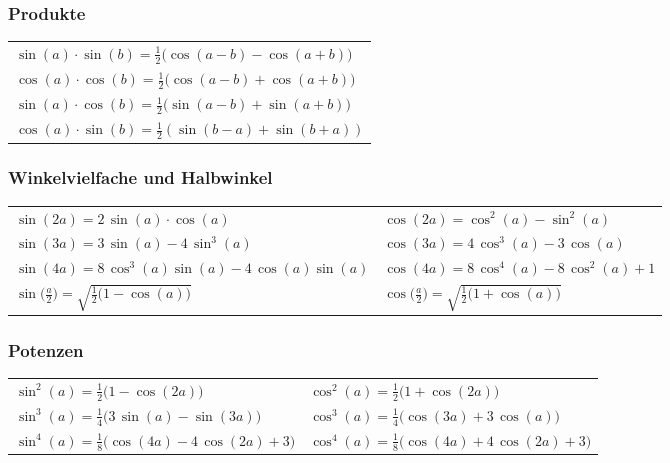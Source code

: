\subsubsection{Produkte}

\begin{tabular}{l}
    $\sin(a) \cdot \sin(b) = \frac{1}{2} \big( \cos(a-b) - \cos(a+b) \big) $ \\
    $\cos(a) \cdot \cos(b) = \frac{1}{2} \big( \cos(a-b) + \cos(a+b) \big) $ \\	
    $\sin(a) \cdot \cos(b) = \frac{1}{2} \big( \sin(a-b) + \sin(a+b) \big) $ \\
    $\cos(a) \cdot \sin(b) = \frac{1}{2} \left( \sin(b - a) + \sin(b + a) \right)$
\end{tabular}


\subsubsection{Winkelvielfache und Halbwinkel}

\begin{tabular}{ll}
    $\sin(2a) = 2 \, \sin(a) \cdot \cos(a)$                                 & $\cos(2a) = \cos^2(a) - \sin^2(a)$ \\
    $\sin(3a) = 3 \, \sin(a) -4 \, \sin^3(a)$                               & $\cos(3a) = 4 \, \cos^3(a) -3 \, \cos(a)$\\ \medskip
    $\sin(4a) = 8 \, \cos^3(a) \sin(a) - 4 \, \cos(a) \sin(a)$              & $\cos(4a) = 8 \, \cos^4(a) - 8 \, \cos^2(a) + 1$\\
    $\sin \Big( \frac{a}{2} \Big) = \sqrt{\frac{1}{2} \big(1-\cos(a) \big)}$& $\cos \Big( \frac{a}{2} \Big) = \sqrt{\frac{1}{2} \big(1+\cos(a) \big)}$
\end{tabular}


\subsubsection{Potenzen}

\begin{tabular}{ll}
    $\sin^2(a) = \frac{1}{2} \big(1-\cos(2a) \big)$                   & $\cos^2(a) = \frac{1}{2} \big(1+\cos(2a) \big)$                     \\	
    $\sin^3(a) = \frac{1}{4} \big(3\, \sin(a) - \sin(3a) \big)$       & $\cos^3(a) = \frac{1}{4} \big(\cos(3a) + 3 \, \cos(a) \big)$        \\	
    $\sin^4(a) = \frac{1}{8} \big(\cos(4a) -4 \, \cos(2a) +3 \big)$   & $\cos^4(a) = \frac{1}{8} \big(\cos(4a) + 4 \, \cos(2a) +3 \big)$
\end{tabular}
\renewcommand{\arraystretch}{1}

